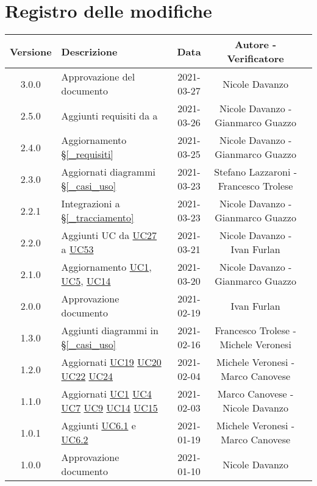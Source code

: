 \section*{Registro delle modifiche}

\begin{center}
	\begin{longtable}{|c|p{5cm}|c|c|c|}
	\hline
	\rowcolor{lighter-grayer}
	\textbf{Versione} & \textbf{Descrizione} & \textbf{Data} & \textbf{Autore - Verificatore} \\
	\hline
	\endfirsthead

	\hline
	3.0.0 & Approvazione del documento & 2021-03-27 & Nicole Davanzo \\
	2.5.0 & Aggiunti requisiti da {F}{29} a {F}{43} & 2021-03-26 & Nicole Davanzo - Gianmarco Guazzo\\
	2.4.0 & Aggiornamento \S\ref{_requisiti} & 2021-03-25 & Nicole Davanzo - Gianmarco Guazzo\\
	2.3.0 & Aggiornati diagrammi \S\ref{_casi_uso} & 2021-03-23 & Stefano Lazzaroni - Francesco Trolese\\
	2.2.1 & Integrazioni a \S\ref{_tracciamento}  & 2021-03-23 & Nicole Davanzo - Gianmarco Guazzo\\
	2.2.0 & Aggiunti UC da \hyperref[UC27]{UC27} a \hyperref[UC53]{UC53} & 2021-03-21 &  Nicole Davanzo - Ivan Furlan\\
	2.1.0 & Aggiornamento \hyperref[UC1]{UC1}, \hyperref[UC5]{UC5}, \hyperref[UC14]{UC14} & 2021-03-20 & Nicole Davanzo - Gianmarco Guazzo \\
	2.0.0 & Approvazione documento & 2021-02-19 & Ivan Furlan\\
	1.3.0 & Aggiunti diagrammi in \S\ref{_casi_uso} & 2021-02-16 & Francesco Trolese - Michele Veronesi \\
	1.2.0 & Aggiornati \hyperref[UC19]{UC19} \hyperref[UC20]{UC20} \hyperref[UC22]{UC22} \hyperref[UC24]{UC24} & 2021-02-04 & Michele Veronesi - Marco Canovese\\
	1.1.0 & Aggiornati \hyperref[UC1]{UC1} \hyperref[UC4]{UC4} \hyperref[UC7]{UC7} \hyperref[UC9]{UC9} \hyperref[UC14]{UC14} \hyperref[UC15]{UC15} & 2021-02-03 & Marco Canovese - Nicole Davanzo\\
	1.0.1 & Aggiunti \hyperref[UC6.1]{UC6.1} e \hyperref[UC6.2]{UC6.2} & 2021-01-19 & Michele Veronesi - Marco Canovese\\
	1.0.0 & Approvazione documento & 2021-01-10 & Nicole Davanzo\\

\end{longtable}
\end{center}
